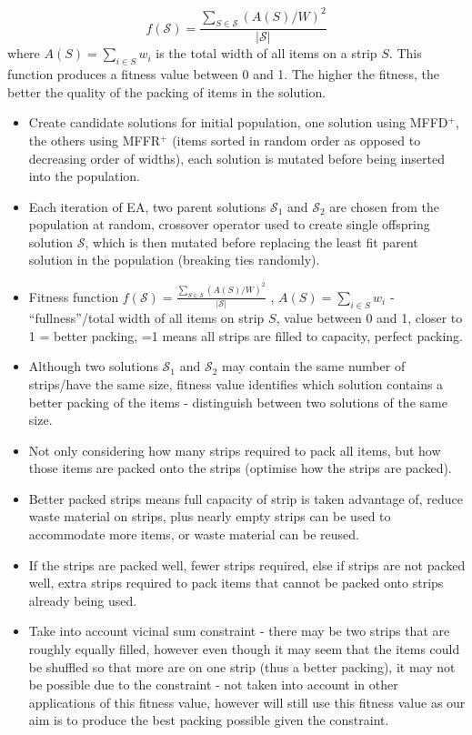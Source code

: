 \documentclass{elsarticle}
\begin{document}
\begin{equation}
	f(\mathcal{S}) = \frac{\sum_{S \in \mathcal{S}} (A(S)/W)^2}{|\mathcal{S}|}
\end{equation}
\noindent where $A(S) = \sum_{i \in S} w_i$ is the total width of all items on a strip $S$. This function produces a fitness value between 0 and 1. The higher the fitness, the better the quality of the packing of items in the solution.

{\color{OrangeRed}
\begin{itemize}
	\item Create candidate solutions for initial population, one solution using MFFD$^+$, the others using MFFR$^+$ (items sorted in random order as opposed to decreasing order of widths), each solution is mutated before being inserted into the population.
	\item Each iteration of EA, two parent solutions $\mathcal{S}_1$ and $\mathcal{S}_2$ are chosen from the population at random, crossover operator used to create single offspring solution $\mathcal{S}$, which is then mutated before replacing the least fit parent solution in the population (breaking ties randomly).
	\item Fitness function $f(\mathcal{S}) = \frac{\sum_{S \in \mathcal{S}} (A(S)/W)^2}{|\mathcal{S}|}$ \cite{falkenauer1992}, $A(S) = \sum_{i \in S} w_i$ - ``fullness''/total width of all items on strip $S$, value between 0 and 1, closer to 1 = better packing, =1 means all strips are filled to capacity, perfect packing.
	\item Although two solutions $\mathcal{S}_1$ and $\mathcal{S}_2$ may contain the same number of strips/have the same size, fitness value identifies which solution contains a better packing of the items - distinguish between two solutions of the same size.
	\item Not only considering how many strips required to pack all items, but how those items are packed onto the strips (optimise how the strips are packed).
	\item Better packed strips means full capacity of strip is taken advantage of, reduce waste material on strips, plus nearly empty strips can be used to accommodate more items, or waste material can be reused.
	\item If the strips are packed well, fewer strips required, else if strips are not packed well, extra strips required to pack items that cannot be packed onto strips already being used.
	\item Take into account vicinal sum constraint - there may be two strips that are roughly equally filled, however even though it may seem that the items could be shuffled so that more are on one strip (thus a better packing), it may not be possible due to the constraint - not taken into account in other applications of this fitness value, however will still use this fitness value as our aim is to produce the best packing possible given the constraint.
\end{itemize}
}
\end{document}
